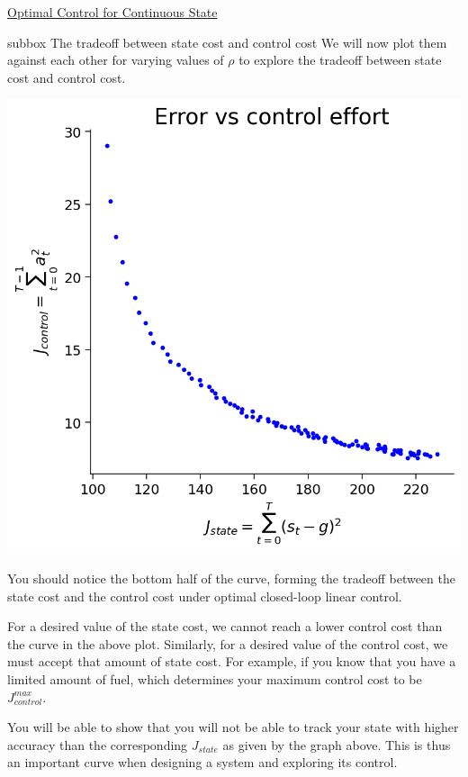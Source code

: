 \begin{textbox}{\href{https://compneuro.neuromatch.io/tutorials/W3D3_OptimalControl/student/W3D3_Tutorial2.html}{Optimal Control for Continuous State}}
\begin{subbox}{subbox}{ The tradeoff between state cost and control cost }
We will now plot them against each other for varying values of $\rho$ to explore the tradeoff between state cost and control cost.
\begin{center}
\includegraphics[scale=0.22]{Figures/OC/OC_Figure10.png}
\end{center}
You should notice the bottom half of the curve, forming the tradeoff between the state cost and the control cost under optimal closed-loop linear control.

For a desired value of the state cost, we cannot reach a lower control cost than the curve in the above plot. Similarly, for a desired value of the control cost, we must accept that amount of state cost. For example, if you know that you have a limited amount of fuel, which determines your maximum control cost to be $J_{control}^{max}$. 

You will be able to show that you will not be able to track your state with higher accuracy than the corresponding $J_{state}$ as given by the graph above. This is thus an important curve when designing a system and exploring its control.

\end{subbox}

\end{textbox}
